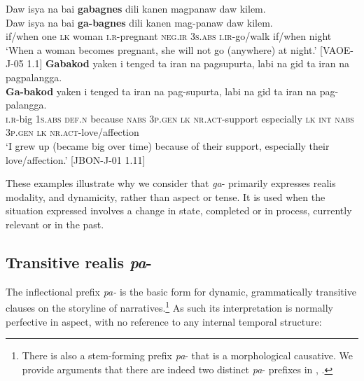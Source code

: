 \ea
Daw  isya  na  bai  \textbf{gabagnes}  dili  kanen  magpanaw  daw  kilem. \\\smallskip
 \gll Daw  isya  na  bai  \textbf{ga-bagnes}  dili  kanen  mag-panaw  daw  kilem. \\
 if/when  one  \textsc{lk}  woman  \textsc{i.r}-pregnant  \textsc{neg.ir}  3\textsc{s.abs}  \textsc{i.ir}-go/walk  if/when  night \\
\glt ‘When a woman becomes pregnant, she will not go (anywhere) at night.’ [VAOE-J-05 1.1]
\z
\ea
\textbf{Gabakod}  yaken  i  tenged  ta  iran  na  pagsupurta, labi  na  gid  ta  iran  na  pagpalangga. \\\smallskip
 \gll \textbf{Ga-bakod}  yaken  i  tenged  ta  iran  na  pag-supurta, labi  na  gid  ta  iran  na  pag-palangga. \\
\textsc{i.r}-big  1\textsc{s.abs}  \textsc{def.n}  because  \textsc{nabs}  3\textsc{p.gen}  \textsc{lk}  \textsc{nr.act}-support
especially  \textsc{lk}  \textsc{int}  \textsc{nabs}   3\textsc{p.gen}  \textsc{lk}  \textsc{nr.act}-love/affection \\
\glt `I grew up (became big over time) because of their support, especially their love/affection.’ [JBON-J-01 1.11]
\z

These examples illustrate why we consider that \textit{ga}{}- primarily expresses realis modality, and dynamicity, rather than aspect or tense. It is used when the situation expressed involves a change in state, completed or in process, currently relevant or in the past.

\subsection{Transitive realis \textit{pa}{}-}
\label{sec:transitiverealis}

The inflectional prefix \textit{pa-} is the basic form for dynamic, grammatically transitive clauses on the storyline of narratives.\footnote{There is also a  stem-forming prefix \textit{pa}- that is a morphological causative. We provide arguments that there are indeed two distinct \textit{pa}- prefixes in , .} As such its interpretation is normally perfective in aspect, with no reference to any internal temporal structure:

